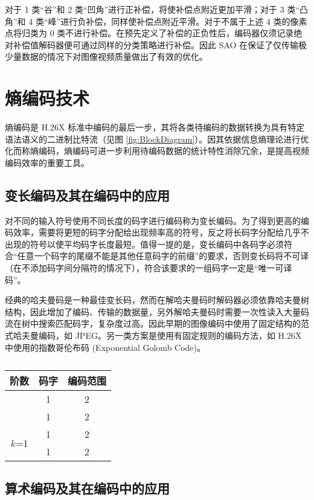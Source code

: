 对于 1 类“谷”和 2 类“凹角”进行正补偿，将使补偿点附近更加平滑；对于 3 类“凸角”和 4 类“峰”进行负补偿，同样使补偿点附近平滑。对于不属于上述 4 类的像素点将归类为 0 类不进行补偿。在预先定义了补偿的正负性后，编码器仅须记录绝对补偿值解码器便可通过同样的分类策略进行补偿。因此 SAO 在保证了仅传输极少量数据的情况下对图像视频质量做出了有效的优化。

\section{熵编码技术}
熵编码是 H.26X 标准中编码的最后一步，其将各类待编码的数据转换为具有特定语法语义的二进制比特流（见图 \ref{fig:BlockDiagram}）。因其依据信息熵理论进行优化而称熵编码，熵编码可进一步利用待编码数据的统计特性消除冗余，是提高视频编码效率的重要工具。
\subsection{变长编码及其在编码中的应用}
对不同的输入符号使用不同长度的码字进行编码称为变长编码。为了得到更高的编码效率，需要将更短的码字分配给出现频率高的符号，反之将长码字分配给几乎不出现的符号以使平均码字长度最短。值得一提的是，变长编码中各码字必须符合“任意一个码字的尾缀不能是其他任意码字的前缀”的要求，否则变长码将不可译（在不添加码字间分隔符的情况下），符合该要求的一组码字一定是“唯一可译码”。

经典的哈夫曼码是一种最佳变长码，然而在解哈夫曼码时解码器必须依靠哈夫曼树结构，因此增加了编码、传输的数据量，另外解哈夫曼码时需要一次性读入大量码流在树中搜索匹配码字，复杂度过高。因此早期的图像编码中使用了固定结构的范式哈夫曼编码，如 JPEG。另一类方案是使用有固定规则的编码方法，如 H.26X 中使用的指数哥伦布码 (Exponential Golomb Code)。
\begin{longtable}[c]{@{}ccc@{}}
\caption{}
\label{tab:my-table}\\
\toprule
阶数                     & 码字 & 编码范围 \\* \midrule
\endfirsthead
%
\endhead
%
\bottomrule
\endfoot
%
\endlastfoot
%
\multirow{2}{*}{$k$=0} & 1  & 2    \\
                       & 1  & 2    \\
\multirow{2}{*}{$k$=1} & 1  & 2    \\
                       & 1  & 2    \\* \bottomrule
\end{longtable}

\subsection{算术编码及其在编码中的应用}
